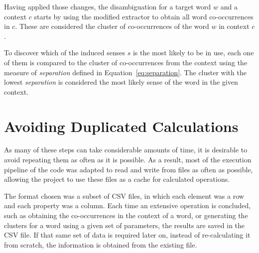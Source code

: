 Having applied those changes, the disambiguation for a target word $w$ and a
context $c$ starts by using the modified extractor to obtain all word 
co-occurrences in $c$. These are considered the cluster of co-occurrences of the
word $w$ in context $c$.

To discover which of the induced senses $s$ is the most likely to be in use,
each one of them is compared to the cluster of co-occurrences from the context
using the measure of \emph{separation} defined in Equation~\ref{eq:separation}.
The cluster with the lowest \emph{separation} is considered the most likely
sense of the word in the given context.

\section{Avoiding Duplicated Calculations}

As many of these steps can take considerable amounts of time, it is desirable to
avoid repeating them as often as it is possible. As a result, most of the
execution pipeline of the code was adapted to read and write from files as often
as possible, allowing the project to use these files as a cache for calculated
operations.

The format chosen was a subset of \ac{CSV} files, in which each element was a
row and each property was a column. Each time an extensive operation is
concluded, such as obtaining the co-occurrences in the context of a word, or
generating the clusters for a word using a given set of parameters, the results
are saved in the CSV file. If that same set of data is required later on,
instead of re-calculating it from scratch, the information is obtained from the
existing file.

